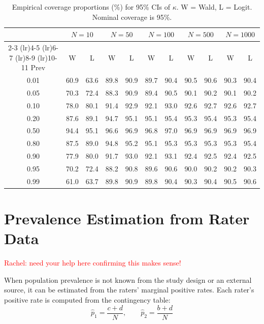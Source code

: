 \documentclass[11pt]{article}
\begin{document}
\begin{table}[h!]
\centering
\caption{Empirical coverage proportions (\%) for 95\% CIs of $\kappa$. W = Wald, L = Logit. Nominal coverage is 95\%.}
\label{tab:coverage}
\small
\begin{tabular}{c cc cc cc cc cc}
\toprule
& \multicolumn{2}{c}{$N = 10$} & \multicolumn{2}{c}{$N = 50$} & \multicolumn{2}{c}{$N = 100$} & \multicolumn{2}{c}{$N = 500$} & \multicolumn{2}{c}{$N = 1000$} \\
\cmidrule(lr){2-3} \cmidrule(lr){4-5} \cmidrule(lr){6-7} \cmidrule(lr){8-9} \cmidrule(lr){10-11}
Prev & W & L & W & L & W & L & W & L & W & L \\
\midrule
0.01 & 60.9 & 63.6 & 89.8 & 90.9 & 89.7 & 90.4 & 90.5 & 90.6 & 90.3 & 90.4 \\
0.05 & 70.3 & 72.4 & 88.3 & 90.9 & 89.4 & 90.5 & 90.1 & 90.2 & 90.1 & 90.2 \\
0.10 & 78.0 & 80.1 & 91.4 & 92.9 & 92.1 & 93.0 & 92.6 & 92.7 & 92.6 & 92.7 \\
0.20 & 87.6 & 89.1 & 94.7 & 95.1 & 95.1 & 95.4 & 95.3 & 95.4 & 95.3 & 95.4 \\
0.50 & 94.4 & 95.1 & 96.6 & 96.9 & 96.8 & 97.0 & 96.9 & 96.9 & 96.9 & 96.9 \\
0.80 & 87.5 & 89.0 & 94.8 & 95.2 & 95.1 & 95.3 & 95.3 & 95.3 & 95.3 & 95.4 \\
0.90 & 77.9 & 80.0 & 91.7 & 93.0 & 92.1 & 93.1 & 92.4 & 92.5 & 92.4 & 92.5 \\
0.95 & 70.2 & 72.4 & 88.2 & 90.8 & 89.6 & 90.6 & 90.0 & 90.2 & 90.2 & 90.3 \\
0.99 & 61.0 & 63.7 & 89.8 & 90.9 & 89.8 & 90.4 & 90.3 & 90.4 & 90.5 & 90.6 \\
\bottomrule
\end{tabular}
\end{table}

\newpage
\section{Prevalence Estimation from Rater Data}
\label{app:prevalence}

\textcolor{red}{Rachel: need your help here confirming this makes sense!}

When population prevalence is not known from the study design or an external source, it can be estimated from the raters' marginal positive rates. Each rater's positive rate is computed from the contingency table:
\begin{equation}
\hat{p}_1 = \frac{c + d}{N}, \qquad \hat{p}_2 = \frac{b + d}{N}
\end{equation}
\end{document}
